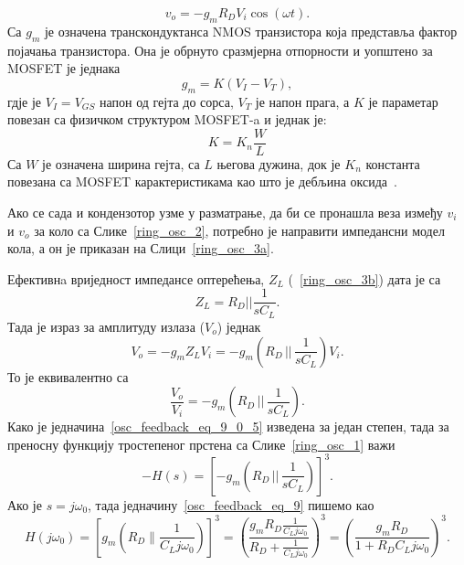 \documentclass[master]{finthesis}
\begin{document}
\begin{equation} 
	\label{osc_feedback_eq_9_0_2}
	v_{o} = -g_{m}R_{D}V_{i}\cos (\omega t).
\end{equation}
Са $g_{m}$ је означена транскондуктанса NMOS транзистора која представља фактор појачања транзистора. Она је обрнуто сразмјерна отпорности и уопштено за MOSFET је једнака
\begin{equation} 
	\label{osc_feedback_eq_9_1}
	g_{m} = K(V_{I} - V_{T}),
\end{equation}
гдје је $V_{I}=V_{GS}$ напон од гејта до сорса, $V_{T}$ је напон прага, а $K$ је параметар повезан са физичком структуром MOSFET-a и једнак је:
\begin{equation} 
	\label{osc_feedback_eq_9_2}
        K = K_{n} \frac{W}{L}
\end{equation}
Са $W$ је означена ширина гејта, са $L$ његова дужина, док је $K_{n}$ константа повезана са MOSFET карактеристикама као што је дебљина оксида~\cite{AGARWAL:2005foundations}. \par
Ако се сада и кондензотор узме у разматрање, да би се пронашла веза између $v_i$ и $v_o$ за коло са Слике~\ref{ring_osc_2}, потребно је направити импедансни модел кола, а он је приказан на Слици~\ref{ring_osc_3a}. \par

Ефективнa вриједност импедансе оптерећења, $Z_L$ (\figurename~\ref{ring_osc_3b}) дата је са
\begin{equation} 
	\label{osc_feedback_eq_9_0_3}
	Z_L = R_{D} || \dfrac{1}{sC_L}.
\end{equation}
Тада је израз за амплитуду излаза ($V_o$) једнак 
\begin{equation} 
	\label{osc_feedback_eq_9_0_4}
	V_o = -g_{m}Z_{L}V_{i} = -g_{m}\left(R_{D}\,||\,\dfrac{1}{sC_{L}}\right)V_{i}.
\end{equation}
То је еквивалентно са
\begin{equation} 
	\label{osc_feedback_eq_9_0_5}
	\frac{V_o}{V_i} = -g_{m}\left(R_{D}\,||\,\dfrac{1}{sC_{L}}\right).
\end{equation}
Како је једначина~\ref{osc_feedback_eq_9_0_5} изведена за један степен, тада за преносну функцију тростепеног прстена са Слике~\ref{ring_osc_1} важи~\cite{Razavi:PLL_CMOS_2020}
\begin{equation} 
	\label{osc_feedback_eq_9}
	-H(s) = \left[-g_{m}\left(R_{D}\,||\,\frac{1}{sC_{L}}\right)\right]^{3}.
\end{equation}
Ако је $s=j\omega_{0}$, тада једначину~\ref{osc_feedback_eq_9} пишемо као
\begin{equation} 
	\label{osc_feedback_eq_10}
	\displaystyle
	H(j\omega_{0}) = \left[g_{m}\left(R_{D}\|\frac{1}{C_{L}j\omega_{0}}\right)\right]^{3} = \left(\frac{g_{m}R_{D}\displaystyle\frac{1}{C_{L}j\omega_{0}}}{R_{D}+\displaystyle\frac{1}{C_{L}j\omega_{0}}}\right)^{3} = \left(\frac{g_{m}R_{D}}{1+R_{D}C_{L}j\omega_{0}}\right)^{3}.
\end{equation}
\end{document}
